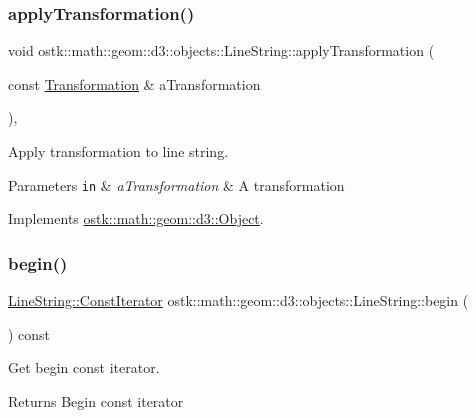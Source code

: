 \subsubsection{\texorpdfstring{apply\+Transformation()}{applyTransformation()}}
{\footnotesize\ttfamily void ostk\+::math\+::geom\+::d3\+::objects\+::\+Line\+String\+::apply\+Transformation (\begin{DoxyParamCaption}\item[{const \hyperlink{classostk_1_1math_1_1geom_1_1d3_1_1_transformation}{Transformation} \&}]{a\+Transformation }\end{DoxyParamCaption})\hspace{0.3cm}{\ttfamily [override]}, {\ttfamily [virtual]}}



Apply transformation to line string. 


\begin{DoxyParams}[1]{Parameters}
\mbox{\tt in}  & {\em a\+Transformation} & A transformation \\
\hline
\end{DoxyParams}


Implements \hyperlink{classostk_1_1math_1_1geom_1_1d3_1_1_object_ae9194dd6d2bb4df09292ffc84dccdb1d}{ostk\+::math\+::geom\+::d3\+::\+Object}.

\mbox{\label{classostk_1_1math_1_1geom_1_1d3_1_1objects_1_1_line_string_ae2fe3d5d27963cc67cac8b42dc89369d}} 
\subsubsection{\texorpdfstring{begin()}{begin()}}
{\footnotesize\ttfamily \hyperlink{classostk_1_1math_1_1geom_1_1d3_1_1objects_1_1_line_string_a5d184ce7a4ef5613a621f9b628e56de8}{Line\+String\+::\+Const\+Iterator} ostk\+::math\+::geom\+::d3\+::objects\+::\+Line\+String\+::begin (\begin{DoxyParamCaption}{ }\end{DoxyParamCaption}) const}



Get begin const iterator. 

\begin{DoxyReturn}{Returns}
Begin const iterator 
\end{DoxyReturn}
\mbox{\label{classostk_1_1math_1_1geom_1_1d3_1_1objects_1_1_line_string_acc60289c51f32f822d7ecee85e876a75}} 
